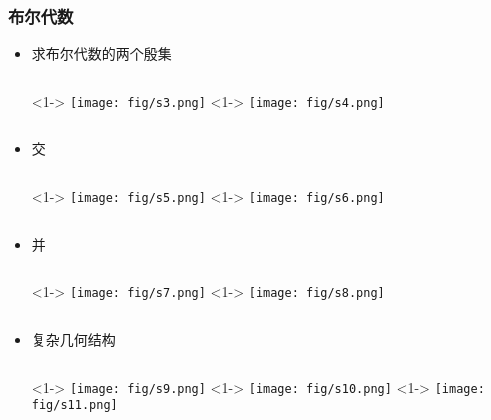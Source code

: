 \documentclass[UTF8]{ctexbeamer}	%
\theoremstyle{plain}
\theoremstyle{definition}
\theoremstyle{remark}
\numberwithin{equation}{section}
\begin{document}
\begin{frame}
    \frametitle{布尔代数}
    \begin{itemize}
        \item 求布尔代数的两个殷集
        \begin{columns}
            <1->
                \texttt{[image: fig/s3.png]}
            <1->
            \texttt{[image: fig/s4.png]}
        \end{columns}
        \item 交
        \begin{columns}
            <1->
                \texttt{[image: fig/s5.png]}
            <1->
            \texttt{[image: fig/s6.png]}
        \end{columns}
    \end{itemize}
\end{frame}

\begin{frame}
    \begin{itemize}
        \item 并 \begin{columns}
            <1->
                \texttt{[image: fig/s7.png]}
            <1->
            \texttt{[image: fig/s8.png]}
        \end{columns}
        \item 复杂几何结构
        \begin{columns}
            <1->
                \texttt{[image: fig/s9.png]}
            <1->
            \texttt{[image: fig/s10.png]}
            <1->
            \texttt{[image: fig/s11.png]}
        \end{columns}
    \end{itemize}
\end{frame}
\end{document}
